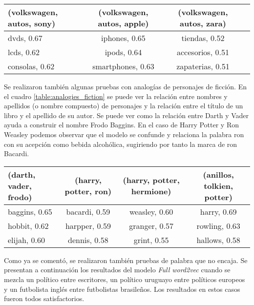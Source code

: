 \begin{table*}[ht]
    \centering
    \begin{tabular}{lccc}
        \hline
        (volkswagen, autos, sony) & (volkswagen, autos, apple) & (volkswagen, autos, zara)\\
        \hline
        dvds, 0.67 & iphones, 0.65 & tiendas, 0.52\\
        lcds, 0.62 & ipods, 0.64 & accesorios, 0.51\\
        consolas, 0.62 & smartphones, 0.63 & zapaterias, 0.51\\
        \hline
    \end{tabular}
    \caption{Analogías relacionadas a marcas y sus productos.}
    \label{table:analogies_companies_products}
\end{table*}

Se realizaron también algunas pruebas con analogías de personajes de ficción. En el cuadro
\ref{table:analogies_fiction} se puede ver la relación entre nombres y apellidos
(o nombre compuesto) de personajes y la relación entre el título de un libro y el apellido de su
autor. Se puede ver como la relación entre Darth y Vader ayuda a construir el nombre Frodo
Baggins. En el caso de Harry Potter y Ron Weasley podemos observar que el modelo se
confunde y relaciona la palabra ron con su acepción como bebida alcohólica, sugiriendo por
tanto la marca de ron Bacardi.

\begin{table*}[ht]
    \centering
    \begin{tabular}{lccc}
        \hline
        (darth, vader, frodo) & (harry, potter, ron) & (harry, potter, hermione) & (anillos, tolkien, potter)\\
        \hline
        baggins, 0.65 & bacardi, 0.59 & weasley, 0.60 & harry, 0.69\\
        hobbit, 0.62 & harpper, 0.59 & granger, 0.57 & rowling, 0.63\\
        elijah, 0.60 & dennis, 0.58 & grint, 0.55 & hallows, 0.58\\
        \hline
    \end{tabular}
    \caption{Analogías relacionadas a personajes y autores de ficción.}
    \label{table:analogies_fiction}
\end{table*}

Como ya se comentó, se realizaron también pruebas de palabra que no encaja. Se presentan
a continuación los resultados del modelo \textit{Full word2vec} cuando se mezcla un político
entre escritores, un político uruguayo entre políticos europeos y un futbolista inglés entre
futbolistas brasileños. Los resultados en estos casos fueron todos satisfactorios.

